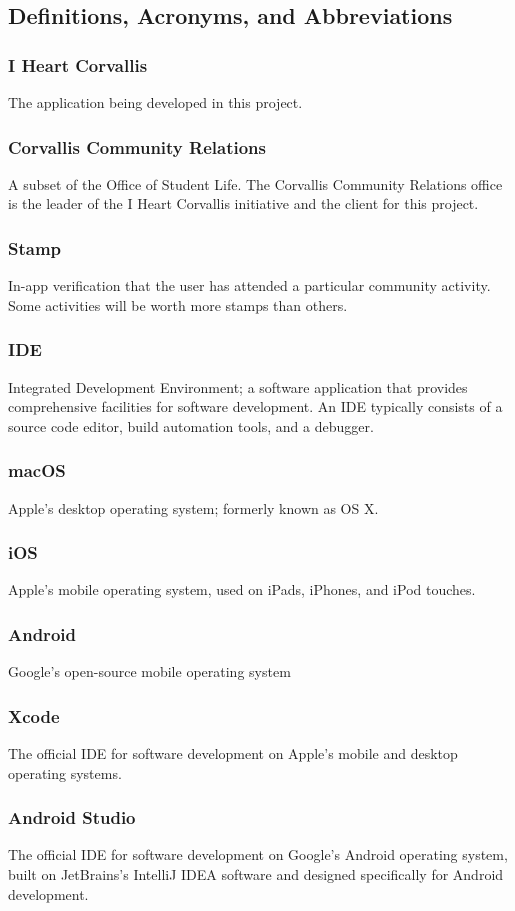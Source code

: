 \documentclass[draftclsnofoot, onecolumn, 10pt, compsoc]{IEEEtran}
\begin{document}
		\subsection{Definitions, Acronyms, and Abbreviations}
			\subsubsection{I Heart Corvallis} The application being developed in this project.
			\subsubsection{Corvallis Community Relations} A subset of the Office of Student Life. The Corvallis Community Relations office is the leader of the I Heart Corvallis initiative and the client for this project.
			\subsubsection{Stamp} In-app verification that the user has attended a particular community activity. Some activities will be worth more stamps than others.
			\subsubsection{IDE} Integrated Development Environment; a software application that provides comprehensive facilities for software development. An IDE typically consists of a source code editor, build automation tools, and a debugger.
			\subsubsection{macOS} Apple's desktop operating system; formerly known as OS X.
			\subsubsection{iOS} Apple's mobile operating system, used on iPads, iPhones, and iPod touches.
			\subsubsection{Android} Google's open-source mobile operating system
			\subsubsection{Xcode} The official IDE for software development on Apple's mobile and desktop operating systems.
			\subsubsection{Android Studio} The official IDE for software development on Google's Android operating system, built on JetBrains's IntelliJ IDEA software and designed specifically for Android development.
\end{document}
